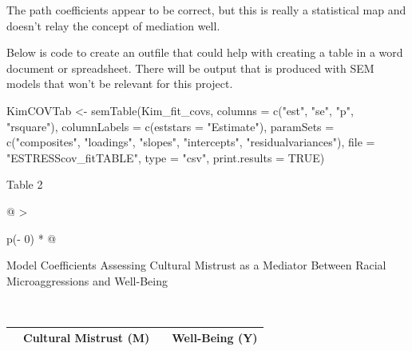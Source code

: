 \documentclass[
]{book}
\newenvironment{Shaded}{\begin{snugshade}}{\end{snugshade}}
\newcommand{\AttributeTok}[1]{\textcolor[rgb]{0.77,0.63,0.00}{#1}}
\newcommand{\ConstantTok}[1]{\textcolor[rgb]{0.00,0.00,0.00}{#1}}
\newcommand{\FunctionTok}[1]{\textcolor[rgb]{0.00,0.00,0.00}{#1}}
\newcommand{\NormalTok}[1]{#1}
\newcommand{\OtherTok}[1]{\textcolor[rgb]{0.56,0.35,0.01}{#1}}
\newcommand{\StringTok}[1]{\textcolor[rgb]{0.31,0.60,0.02}{#1}}
\begin{document}
The path coefficients appear to be correct, but this is really a statistical map and doesn't relay the concept of mediation well.

Below is code to create an outfile that could help with creating a table in a word document or spreadsheet. There will be output that is produced with SEM models that won't be relevant for this project.

\begin{Shaded}
\begin{Highlighting}[]
\NormalTok{KimCOVTab }\OtherTok{\textless{}{-}} \FunctionTok{semTable}\NormalTok{(Kim\_fit\_covs, }\AttributeTok{columns =} \FunctionTok{c}\NormalTok{(}\StringTok{"est"}\NormalTok{, }\StringTok{"se"}\NormalTok{, }\StringTok{"p"}\NormalTok{, }\StringTok{"rsquare"}\NormalTok{),  }\AttributeTok{columnLabels =} \FunctionTok{c}\NormalTok{(}\AttributeTok{eststars =} \StringTok{"Estimate"}\NormalTok{), }\AttributeTok{paramSets =} \FunctionTok{c}\NormalTok{(}\StringTok{"composites"}\NormalTok{, }\StringTok{"loadings"}\NormalTok{, }\StringTok{"slopes"}\NormalTok{, }\StringTok{"intercepts"}\NormalTok{, }\StringTok{"residualvariances"}\NormalTok{), }\AttributeTok{file =} \StringTok{"ESTRESScov\_fitTABLE"}\NormalTok{, }\AttributeTok{type =} \StringTok{"csv"}\NormalTok{, }\AttributeTok{print.results =} \ConstantTok{TRUE}\NormalTok{)}
\end{Highlighting}
\end{Shaded}

Table 2

\begin{longtable}[]{@{}
  >{\raggedright\arraybackslash}p{(\columnwidth - 0\tabcolsep) * }@{}}
\toprule
\begin{minipage}[b]{\linewidth}\raggedright
Model Coefficients Assessing Cultural Mistrust as a Mediator Between Racial Microaggressions and Well-Being
\end{minipage} \\
\midrule
\endhead
\bottomrule
\end{longtable}

\begin{longtable}[]{@{}
  >{\raggedright\arraybackslash}p{}
  >{\centering\arraybackslash}p{}
  >{\centering\arraybackslash}p{}
  >{\centering\arraybackslash}p{}@{}}
\toprule
\endhead
& Cultural Mistrust (M) & & Well-Being (Y) \\
\bottomrule
\end{longtable}
\end{document}
